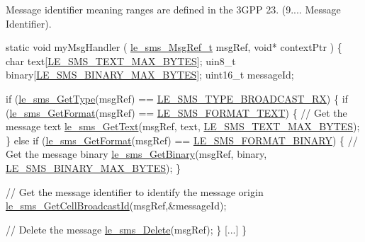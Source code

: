 Message identifier meaning ranges are defined in the 3\+G\+P\+P 23. (9.... Message Identifier).


\begin{DoxyCode}
[...]

\textcolor{keyword}{static} \textcolor{keywordtype}{void} myMsgHandler
(
    \hyperlink{le__sms__interface_8h_a8eb2a15362fe26516fc68fd7a7d5e3e7}{le\_sms\_MsgRef\_t} msgRef,
    \textcolor{keywordtype}{void}* contextPtr
)
\{
    \textcolor{keywordtype}{char} text[\hyperlink{le__sms__interface_8h_a0dc5c2cec7c1fb166c47393fbb07e43f}{LE\_SMS\_TEXT\_MAX\_BYTES}];
    uin8\_t binary[\hyperlink{le__sms__interface_8h_a5bf62f998e950de37b56813d8c5d9b95}{LE\_SMS\_BINARY\_MAX\_BYTES}];
    uint16\_t messageId;

    \textcolor{keywordflow}{if} (\hyperlink{le__sms__interface_8h_a2a63c6b5179025a80fb86c7f188e1eb7}{le\_sms\_GetType}(msgRef) == \hyperlink{le__sms__interface_8h_a9001c5bc939bda5d5865e363bdf7662ca3dff7628faf85524d772f34f52699a47}{LE\_SMS\_TYPE\_BROADCAST\_RX})
    \{
        \textcolor{keywordflow}{if} (\hyperlink{le__sms__interface_8h_a5c2b8ce7043b4732c7b0ede7c5d7118c}{le\_sms\_GetFormat}(msgRef) == \hyperlink{le__sms__interface_8h_a337778c44e63660c44fa2116699296c0a1bb6a0d76a622b1185ee879e1595dff8}{LE\_SMS\_FORMAT\_TEXT})
        \{
            \textcolor{comment}{// Get the message text}
            \hyperlink{le__sms__interface_8h_ac598dec158aed1e9fa134daf22c704db}{le\_sms\_GetText}(msgRef, text, \hyperlink{le__sms__interface_8h_a0dc5c2cec7c1fb166c47393fbb07e43f}{LE\_SMS\_TEXT\_MAX\_BYTES});
        \}
        \textcolor{keywordflow}{else} \textcolor{keywordflow}{if} (\hyperlink{le__sms__interface_8h_a5c2b8ce7043b4732c7b0ede7c5d7118c}{le\_sms\_GetFormat}(msgRef) == 
      \hyperlink{le__sms__interface_8h_a337778c44e63660c44fa2116699296c0ac70333fc9281ed10aa405d585689c000}{LE\_SMS\_FORMAT\_BINARY})
        \{
            \textcolor{comment}{// Get the message binary}
            \hyperlink{le__sms__interface_8h_a0de50069a9df99adac983385106d9c09}{le\_sms\_GetBinary}(msgRef, binary, 
      \hyperlink{le__sms__interface_8h_a5bf62f998e950de37b56813d8c5d9b95}{LE\_SMS\_BINARY\_MAX\_BYTES});
        \}

        \textcolor{comment}{// Get the message identifier to identify the message origin}
        \hyperlink{le__sms__interface_8h_aa28c1d04ff19b88100b766737610b128}{le\_sms\_GetCellBroadcastId}(msgRef,&messageId);

        \textcolor{comment}{// Delete the message}
        \hyperlink{le__sms__interface_8h_aca1691010c88995cb47225f2889910fa}{le\_sms\_Delete}(msgRef);
    \}
    [...]
\}



\end{DoxyCode}
